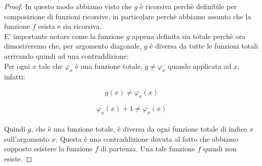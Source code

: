 \begin{proof}
  In questo modo abbiamo visto che $g$ è ricorsiva perchè definibile per composizione di funzioni ricorsive, in particolare
  perchè abbiamo assunto che la funzione $f$ esista e sia ricorsiva.\\

  E' importante notare come la funzione $g$ appena definita sia totale perchè ora dimostreremo che, per argomento diagonale, 
  $g$ è diversa da tutte le funzioni totali arrivando quindi ad una contraddizione:\\

  Per ogni $x$ tale che $\varphi_x$ è una funzione totale, $g \neq \varphi_x$ quando applicata ad $x$, infatti:

  \[
  g(x) \neq \varphi_x(x)
  \]

  \[
  \varphi_x(x) + 1 \neq \varphi_x(x)
  \]\\
  Quindi $g$, che è una funzione totale, è diversa da ogni funzione totale di indice $x$ sull'argomento $x$. Questa è una contraddizione
  dovuta al fatto che abbiamo supposto esistere la funzione $f$ di partenza. Una tale funzione $f$ quindi non esiste. 
\end{proof}